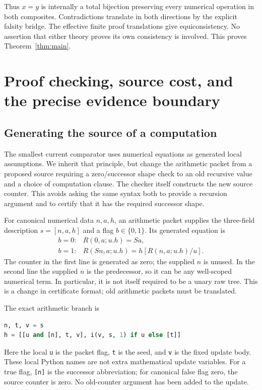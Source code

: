 \documentclass[11pt,letterpaper]{article}
\theoremstyle{definition}\newtheorem{definition}[theorem]{Definition}
\theoremstyle{remark}\newtheorem{remark}[theorem]{Remark}
\begin{document}
Thus $x=y$ is internally a total bijection preserving every numerical
operation in both composites. Contradictions translate in both directions
by the explicit falsity bridge. The effective finite proof translations
give equiconsistency. No assertion that either theory proves its own
consistency is involved. This proves Theorem~\ref{thm:main}.

\section{Proof checking, source cost, and the precise evidence boundary}
\label{sec:implementation}
\subsection{Generating the source of a computation}

The smallest current comparator uses numerical equations as generated
local assumptions. We inherit that principle, but change the arithmetic
packet from a proposed source requiring a zero/successor shape check to
an old recursive value and a choice of computation clause. The checker
itself constructs the new source counter. This avoids asking the same
syntax both to provide a recursion argument and to certify that it has
the required successor shape.

For canonical numerical data $n,a,h$, an arithmetic packet supplies the
three-field description $s=[n,a,h]$ and a flag $b\in\{0,1\}$. Its generated
equation is
\[
\begin{array}{ll}
b=0:&R(0,a;u.h)=Sa,\\[2pt]
b=1:&R(Sn,a;u.h)=h[R(n,a;u.h)/u].
\end{array}
\]
The counter in the first line is generated as zero; the supplied $n$ is
unused. In the second line the supplied $n$ is the predecessor, so it can
be any well-scoped numerical term. In particular, it is not itself
required to be a unary raw tree. This is a change in certificate format;
old arithmetic packets must be translated.

The exact arithmetic branch is
\begin{lstlisting}[language=Python]
n, t, v = s
h = [[u and [n], t, v], i(v, s, 1) if u else [t]]
\end{lstlisting}
Here the local \texttt{u} is the packet flag, \texttt{t} is the seed, and
\texttt{v} is the fixed update body. These local Python names are not
extra mathematical update variables. For a true flag, \texttt{[n]} is
the successor abbreviation; for canonical false flag zero, the source
counter is zero. No old-counter argument has been added to the update.
\end{document}
